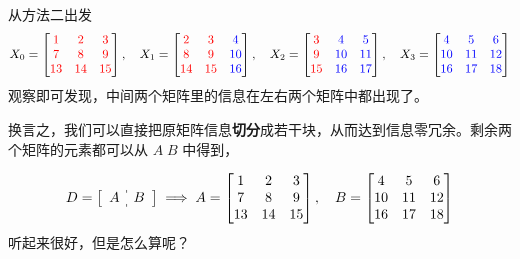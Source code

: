 \documentclass[aspectratio=169,10pt]{beamer}
\begin{document}
\begin{frame}[fragile]{从方法二出发}
\[
X_0 =
\begin{bmatrix}
{\color{red}1} & {\color{red}2} & {\color{red}3} \\
{\color{red}7} & {\color{red}8} & {\color{red}9} \\
{\color{red}13} & {\color{red}14} & {\color{red}15}
\end{bmatrix},
\quad
X_1 =
\begin{bmatrix}
{\color{red}2} & {\color{red}3} & {\color{blue}4} \\
{\color{red}8} & {\color{red}9} & {\color{blue}10} \\
{\color{red}14} & {\color{red}15} & {\color{blue}16}
\end{bmatrix},
\quad
X_2 =
\begin{bmatrix}
{\color{red}3} & {\color{blue}4} & {\color{blue}5} \\
{\color{red}9} & {\color{blue}10} & {\color{blue}11} \\
{\color{red}15} & {\color{blue}16} & {\color{blue}17}
\end{bmatrix},
\quad
X_3 =
\begin{bmatrix}
{\color{blue}4} & {\color{blue}5} & {\color{blue}6} \\
{\color{blue}10} & {\color{blue}11} & {\color{blue}12} \\
{\color{blue}16} & {\color{blue}17} & {\color{blue}18}
\end{bmatrix}
\]
观察即可发现，中间两个矩阵里的信息在左右两个矩阵中都出现了。
\par
换言之，我们可以直接把原矩阵信息\textbf{切分}成若干块，从而达到信息零冗余。剩余两个矩阵的元素都可以从 $A\;B$ 中得到，
\par
\[
D=
\left[\begin{array}{c:c}
A & B 
\end{array}\right]
\implies A =
\begin{bmatrix}
1 & 2 & 3 \\
7 & 8 & 9 \\
13 & 14 & 15
\end{bmatrix},
\quad
B =
\begin{bmatrix}
4 & 5 & 6 \\
10 & 11 & 12 \\
16 & 17 & 18
\end{bmatrix}
\]
听起来很好，但是怎么算呢？
\par
\end{frame}
\end{document}
